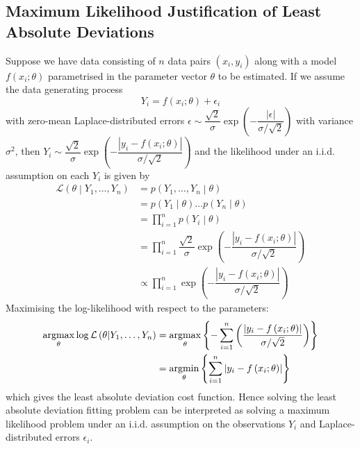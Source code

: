 \documentclass[11pt]{report} %
\begin{document}
\subsection{Maximum Likelihood Justification of Least Absolute Deviations}

Suppose we have data consisting of $n$ data pairs $\left(x_{i}, y_{i}\right)$ along with a model $f\left(x_{i}; \theta\right)$ parametrised in the parameter vector $\theta$ to be estimated. If we assume the data generating process
\begin{equation}
Y_{i} = f\left(x_{i}; \theta\right) + \epsilon_{i}
\end{equation}
with zero-mean Laplace-distributed errors $\epsilon \sim \dfrac{\sqrt{2}}{\sigma}\exp\left(-\dfrac{\left|\epsilon\right|}{\sigma/\sqrt{2}}\right)$ with variance $\sigma^{2}$, then $Y_{i} \sim \dfrac{\sqrt{2}}{\sigma}\exp\left(-\dfrac{\left|y_{i} - f\left(x_{i}; \theta\right)\right|}{\sigma/\sqrt{2}}\right)$ and the likelihood under an i.i.d. assumption on each $Y_{i}$ is given by
\begin{align}
\mathcal{L}\left(\theta\middle|Y_{1}, \dots, Y_{n}\right) &= p\left(Y_{1}, \dots, Y_{n}\middle|\theta\right) \\
&= p\left(Y_{1}\middle|\theta\right)\dots p\left(Y_{n}\middle|\theta\right) \\
&= \prod_{i = 1}^{n}p\left(Y_{i}\middle|\theta\right) \\
&= \prod_{i = 1}^{n}\dfrac{\sqrt{2}}{\sigma}\exp\left(-\dfrac{\left|y_{i} - f\left(x_{i}; \theta\right)\right|}{\sigma/\sqrt{2}}\right) \\
&\propto \prod_{i = 1}^{n}\exp\left(-\dfrac{\left|y_{i} - f\left(x_{i}; \theta\right)\right|}{\sigma/\sqrt{2}}\right)
\end{align}
Maximising the log-likelihood with respect to the parameters:
\begin{align}
\operatorname*{argmax}_{\theta}\log\mathcal{L}\left(\theta\middle|Y_{1}, \dots, Y_{n}\right) &= \operatorname*{argmax}_{\theta}\left\{-\sum_{i = 1}^{n}\left(\dfrac{\left|y_{i} - f\left(x_{i}; \theta\right)\right|}{\sigma/\sqrt{2}}\right)\right\} \\
&= \operatorname*{argmin}_{\theta}\left\{\sum_{i = 1}^{n}\left|y_{i} - f\left(x_{i}; \theta\right)\right|\right\}
\end{align}
which gives the least absolute deviation cost function. Hence solving the least absolute deviation fitting problem can be interpreted as solving a maximum likelihood problem under an i.i.d. assumption on the observations $Y_{i}$ and Laplace-distributed errors $\epsilon_{i}$.
\end{document}
